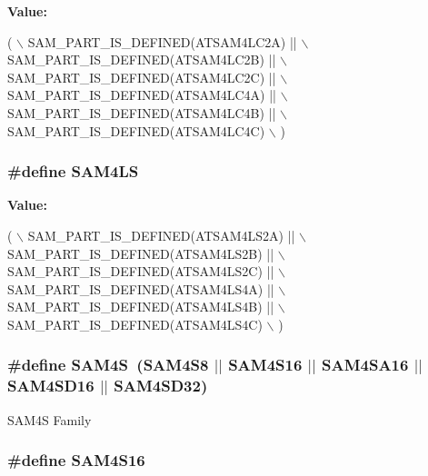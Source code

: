 {\bfseries Value\-:}
\begin{DoxyCode}
( \(\backslash\)
        SAM\_PART\_IS\_DEFINED(ATSAM4LC2A) || \(\backslash\)
        SAM\_PART\_IS\_DEFINED(ATSAM4LC2B) || \(\backslash\)
        SAM\_PART\_IS\_DEFINED(ATSAM4LC2C) || \(\backslash\)
        SAM\_PART\_IS\_DEFINED(ATSAM4LC4A) || \(\backslash\)
        SAM\_PART\_IS\_DEFINED(ATSAM4LC4B) || \(\backslash\)
        SAM\_PART\_IS\_DEFINED(ATSAM4LC4C) \(\backslash\)
        )
\end{DoxyCode}
\hypertarget{group__sam__part__macros__group_gafd288e34365d8a47cadf64f9040b97c6}{
\subsubsection[{S\-A\-M4\-L\-S}]{\setlength{\rightskip}{0pt plus 5cm}\#define S\-A\-M4\-L\-S}}\label{group__sam__part__macros__group_gafd288e34365d8a47cadf64f9040b97c6}
{\bfseries Value\-:}
\begin{DoxyCode}
( \(\backslash\)
        SAM\_PART\_IS\_DEFINED(ATSAM4LS2A) || \(\backslash\)
        SAM\_PART\_IS\_DEFINED(ATSAM4LS2B) || \(\backslash\)
        SAM\_PART\_IS\_DEFINED(ATSAM4LS2C) || \(\backslash\)
        SAM\_PART\_IS\_DEFINED(ATSAM4LS4A) || \(\backslash\)
        SAM\_PART\_IS\_DEFINED(ATSAM4LS4B) || \(\backslash\)
        SAM\_PART\_IS\_DEFINED(ATSAM4LS4C) \(\backslash\)
        )
\end{DoxyCode}
\hypertarget{group__sam__part__macros__group_gac3e6ef71bec5113415a64bb14ce8be24}{
\subsubsection[{S\-A\-M4\-S}]{\setlength{\rightskip}{0pt plus 5cm}\#define S\-A\-M4\-S~({\bf S\-A\-M4\-S8} $|$$|$ {\bf S\-A\-M4\-S16} $|$$|$ {\bf S\-A\-M4\-S\-A16} $|$$|$ {\bf S\-A\-M4\-S\-D16} $|$$|$ {\bf S\-A\-M4\-S\-D32})}}\label{group__sam__part__macros__group_gac3e6ef71bec5113415a64bb14ce8be24}
S\-A\-M4\-S Family \hypertarget{group__sam__part__macros__group_ga1c3c5c80f2c2ca26604ff5d59cb3a0b2}{
\subsubsection[{S\-A\-M4\-S16}]{\setlength{\rightskip}{0pt plus 5cm}\#define S\-A\-M4\-S16}}\label{group__sam__part__macros__group_ga1c3c5c80f2c2ca26604ff5d59cb3a0b2}

